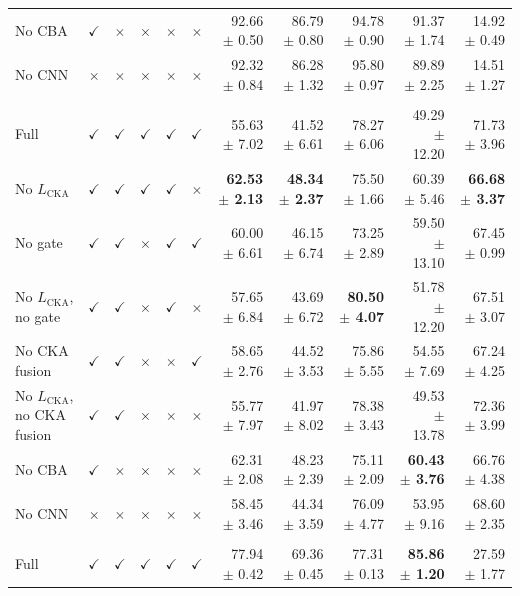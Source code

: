 \documentclass[10pt]{article}
\begin{document}
{\begin{longtable}{lccccc rrrrr}
No CBA & $\checkmark$ & $\times$ & $\times$ & $\times$ & $\times$ & 92.66 $\pm$ 0.50 & 86.79 $\pm$ 0.80 & 94.78 $\pm$ 0.90 & 91.37 $\pm$ 1.74 & 14.92 $\pm$ 0.49 \\
No CNN & $\times$ & $\times$ & $\times$ & $\times$ & $\times$ & 92.32 $\pm$ 0.84 & 86.28 $\pm$ 1.32 & 95.80 $\pm$ 0.97 & 89.89 $\pm$ 2.25 & 14.51 $\pm$ 1.27 \\
\addlinespace[4pt]
\multicolumn{11}{l}{\textit{Source: OTU $\rightarrow$ Target: USOVA}} \\
\midrule
Full & $\checkmark$ & $\checkmark$ & $\checkmark$ & $\checkmark$ & $\checkmark$ & 55.63 $\pm$ 7.02 & 41.52 $\pm$ 6.61 & 78.27 $\pm$ 6.06 & 49.29 $\pm$ 12.20 & 71.73 $\pm$ 3.96 \\
No $L_{\mathrm{CKA}}$ & $\checkmark$ & $\checkmark$ & $\checkmark$ & $\checkmark$ & $\times$ & \textbf{62.53 $\pm$ 2.13} & \textbf{48.34 $\pm$ 2.37} & 75.50 $\pm$ 1.66 & 60.39 $\pm$ 5.46 & \textbf{66.68 $\pm$ 3.37} \\
No gate & $\checkmark$ & $\checkmark$ & $\times$ & $\checkmark$ & $\checkmark$ & 60.00 $\pm$ 6.61 & 46.15 $\pm$ 6.74 & 73.25 $\pm$ 2.89 & 59.50 $\pm$ 13.10 & 67.45 $\pm$ 0.99 \\
No $L_{\mathrm{CKA}}$, no gate & $\checkmark$ & $\checkmark$ & $\times$ & $\checkmark$ & $\times$ & 57.65 $\pm$ 6.84 & 43.69 $\pm$ 6.72 & \textbf{80.50 $\pm$ 4.07} & 51.78 $\pm$ 12.20 & 67.51 $\pm$ 3.07 \\
No CKA fusion & $\checkmark$ & $\checkmark$ & $\times$ & $\times$ & $\checkmark$ & 58.65 $\pm$ 2.76 & 44.52 $\pm$ 3.53 & 75.86 $\pm$ 5.55 & 54.55 $\pm$ 7.69 & 67.24 $\pm$ 4.25 \\
No $L_{\mathrm{CKA}}$, no CKA fusion & $\checkmark$ & $\checkmark$ & $\times$ & $\times$ & $\times$ & 55.77 $\pm$ 7.97 & 41.97 $\pm$ 8.02 & 78.38 $\pm$ 3.43 & 49.53 $\pm$ 13.78 & 72.36 $\pm$ 3.99 \\
No CBA & $\checkmark$ & $\times$ & $\times$ & $\times$ & $\times$ & 62.31 $\pm$ 2.08 & 48.23 $\pm$ 2.39 & 75.11 $\pm$ 2.09 & \textbf{60.43 $\pm$ 3.76} & 66.76 $\pm$ 4.38 \\
No CNN & $\times$ & $\times$ & $\times$ & $\times$ & $\times$ & 58.45 $\pm$ 3.46 & 44.34 $\pm$ 3.59 & 76.09 $\pm$ 4.77 & 53.95 $\pm$ 9.16 & 68.60 $\pm$ 2.35 \\
\addlinespace[4pt]
\multicolumn{11}{l}{\textit{Source: OVATUS $\rightarrow$ Target: OTU}} \\
\midrule
Full & $\checkmark$ & $\checkmark$ & $\checkmark$ & $\checkmark$ & $\checkmark$ & 77.94 $\pm$ 0.42 & 69.36 $\pm$ 0.45 & 77.31 $\pm$ 0.13 & \textbf{85.86 $\pm$ 1.20} & 27.59 $\pm$ 1.77 \\

\end{longtable}}
\end{document}
